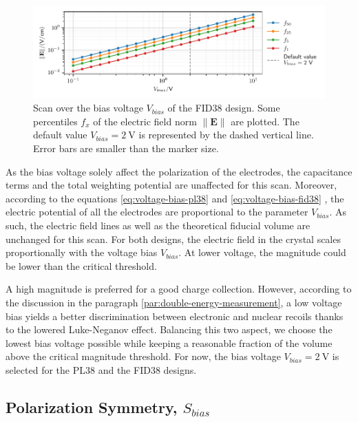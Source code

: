 \begin{figure}
\centering
\includegraphics[scale=1]{Figures/ElectrodesScan/capacitance_fiducial_V_bias.pdf}
\caption{Scan over the bias voltage $V_{bias}$ of the FID38 design. Some percentiles $f_x$ of the electric field norm $\| \mathbf{E} \|$ are plotted. The default value $V_{bias}=\SI{2}{\volt}$ is represented by the dashed vertical line. Error bars are smaller than the marker size.}
\label{fig:capacitance-fiducial-V-bias-pl38}
\end{figure}

As the bias voltage solely affect the polarization of the electrodes, the capacitance terms and the total weighting potential are unaffected for this scan. Moreover, according to the equations \ref{eq:voltage-bias-pl38} and \ref{eq:voltage-bias-fid38} , the electric potential of all the electrodes are proportional to the parameter $V_{bias}$. As such, the electric field lines as well as the theoretical fiducial volume are unchanged for this scan. 
For both designs, the electric field in the crystal scales proportionally with the voltage bias $V_{bias}$. At lower voltage, the magnitude could be lower than the critical threshold.

A high magnitude is preferred for a good charge collection. However, according to the discussion in the paragraph \ref{par:double-energy-measurement}, a low voltage bias yields a better discrimination between electronic and nuclear recoils thanks to the lowered Luke-Neganov effect. Balancing this two aspect, we choose the lowest bias voltage possible while keeping a reasonable fraction of the volume above the critical magnitude threshold. For now, the bias voltage $V_{bias} = \SI{2}{\volt}$ is selected for the PL38 and the FID38 designs.


\subsection{Polarization Symmetry, $S_{bias}$}

